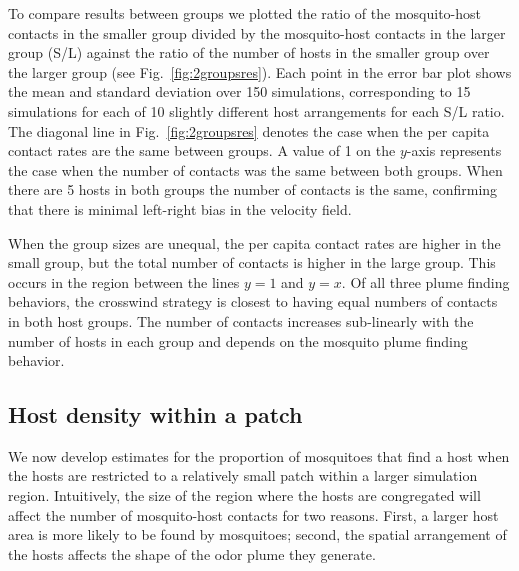 \documentclass[10pt]{article}
\begin{document}
To compare results between groups we plotted
the ratio of the mosquito-host contacts in the smaller group divided by the mosquito-host contacts in the larger group (S/L) against the ratio of the number of hosts in the smaller group over the larger group
(see Fig.~\ref{fig:2groupsres}). Each point in the error bar plot shows the mean and standard deviation over 150 simulations, corresponding to 15 simulations for each of 10 slightly different host arrangements for each S/L ratio. The diagonal line in Fig.~\ref{fig:2groupsres} denotes the case when the per capita contact rates are the same between groups. A value of 1 on the $y$-axis represents the case when the number of contacts was the same between both groups. When there are 5 hosts in both groups the number of contacts is the same, confirming that there is minimal left-right bias in the velocity field.

 When the group sizes are unequal, the per capita contact rates are higher in the small group, but the total number of contacts is higher in the large group. This occurs in the region between the lines $y=1$ and $y=x$. Of all three plume finding behaviors, the crosswind strategy is closest to having equal numbers of contacts in both host groups.  
 The number of contacts increases sub-linearly with the number of hosts in each group and depends on the mosquito plume finding behavior.  


\subsection*{Host density within a patch}\label{sec:res:hostdens}
We now develop estimates for the proportion of mosquitoes that find a host when the hosts are restricted to a relatively small patch within a larger simulation region.  Intuitively, the size of the region where the hosts are congregated will affect the number of mosquito-host contacts for two reasons.  First, a larger host area is more likely to be found by mosquitoes; second, the spatial arrangement of the hosts affects the shape of the odor plume they generate. 
\end{document}
